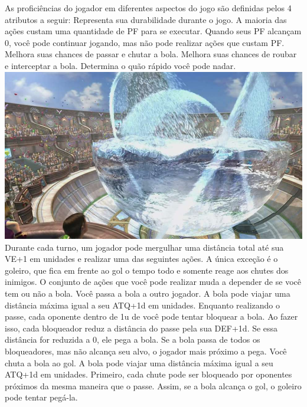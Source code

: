 %
As proficiências do jogador em diferentes aspectos do jogo são definidas pelos 4 atributos a seguir:\ofrow
{} Representa sua durabilidade durante o jogo.
	A maioria das ações custam uma quantidade de PF para se executar.
	Quando seus PF alcançam 0, você pode continuar jogando, mas não pode realizar ações que custam PF.
%
\ofrow
%
 Melhora suas chances de passar e chutar a bola.\ofrow
{} Melhora suas chances de roubar e interceptar a bola.\ofrow
{} Determina o quão rápido você pode nadar.
%
\newpage
%
%
\includegraphics[width=\columnwidth]{./art/blitz/stadium.jpg}
%
\vfill
%
Durante cada turno, um jogador pode mergulhar uma distância total até sua VE+1 em unidades e realizar uma das seguintes ações.
A única exceção é o goleiro, que fica em frente ao gol o tempo todo e somente reage aos chutes dos inimigos.
O conjunto de ações que você pode realizar muda a depender de se você tem ou não a bola.
%
\ofrow
%
 Você passa a bola a outro jogador.
A bola pode viajar uma distância máxima igual a seu ATQ+1d em unidades.
Enquanto realizando o passe, cada oponente dentro de 1u de você pode tentar bloquear a bola.
Ao fazer isso, cada bloqueador reduz a distância do passe pela sua DEF+1d.
Se essa distância for reduzida a 0, ele pega a bola.
Se a bola passa de todos os bloqueadores, mas não alcança seu alvo, o jogador mais próximo a pega.
%	
\ofrow
%
 Você chuta a bola ao gol.
A bola pode viajar uma distância máxima igual a seu ATQ+1d em unidades.
Primeiro, cada chute pode ser bloqueado por oponentes próximos da mesma maneira que o passe. Assim, se a bola alcança o gol, o goleiro pode tentar pegá-la.

